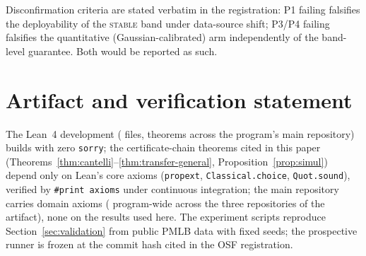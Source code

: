 \documentclass[10pt]{article}
\newcommand{\stab}{\textsc{stable}}
\begin{document}
Disconfirmation criteria are stated verbatim in the registration: P1 failing falsifies
the deployability of the \stab{} band under data-source shift; P3/P4 failing falsifies
the quantitative (Gaussian-calibrated) arm independently of the band-level guarantee.
Both would be reported as such.

\section{Artifact and verification statement}
\label{app:artifact}

The Lean~4 development ({\ClaimMainFiles} files, {\ClaimMainTheorems} theorems across
the program's main repository) builds with zero \texttt{sorry}; the certificate-chain
theorems cited in this paper (Theorems~\ref{thm:cantelli}--\ref{thm:transfer-general},
Proposition~\ref{prop:simul}) depend only on Lean's core axioms
(\texttt{propext}, \texttt{Classical.choice}, \texttt{Quot.sound}), verified by
\texttt{\#print axioms} under continuous integration; the main repository carries
{\ClaimMainAxioms} domain axioms ({\ClaimTotalAxioms} program-wide across the three
repositories of the artifact), none on the results used here. The experiment scripts
reproduce Section~\ref{sec:validation} from public PMLB data with fixed seeds; the
prospective runner is frozen at the commit hash cited in the OSF registration.
\end{document}
